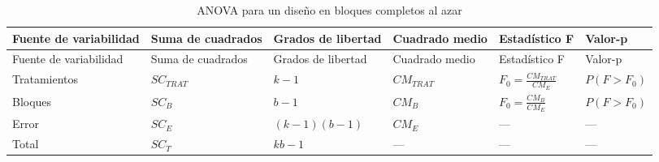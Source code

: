 \documentclass[
  spanish,
  letterpaper,
  DIV=11,
  numbers=noendperiod]{scrreprt}
\begin{document}
\begin{longtable}[]{@{}
  >{\raggedright\arraybackslash}p{}
  >{\raggedright\arraybackslash}p{}
  >{\raggedright\arraybackslash}p{}
  >{\raggedright\arraybackslash}p{}
  >{\raggedright\arraybackslash}p{}
  >{\raggedright\arraybackslash}p{}@{}}
\caption{ANOVA para un diseño en bloques completos al
azar}\label{tbl-anova}\tabularnewline
\toprule\noalign{}
\begin{minipage}[b]{\linewidth}\raggedright
Fuente de variabilidad
\end{minipage} & \begin{minipage}[b]{\linewidth}\raggedright
Suma de cuadrados
\end{minipage} & \begin{minipage}[b]{\linewidth}\raggedright
Grados de libertad
\end{minipage} & \begin{minipage}[b]{\linewidth}\raggedright
Cuadrado medio
\end{minipage} & \begin{minipage}[b]{\linewidth}\raggedright
Estadístico F
\end{minipage} & \begin{minipage}[b]{\linewidth}\raggedright
Valor-p
\end{minipage} \\
\midrule\noalign{}
\endfirsthead
\toprule\noalign{}
\begin{minipage}[b]{\linewidth}\raggedright
Fuente de variabilidad
\end{minipage} & \begin{minipage}[b]{\linewidth}\raggedright
Suma de cuadrados
\end{minipage} & \begin{minipage}[b]{\linewidth}\raggedright
Grados de libertad
\end{minipage} & \begin{minipage}[b]{\linewidth}\raggedright
Cuadrado medio
\end{minipage} & \begin{minipage}[b]{\linewidth}\raggedright
Estadístico F
\end{minipage} & \begin{minipage}[b]{\linewidth}\raggedright
Valor-p
\end{minipage} \\
\midrule\noalign{}
\endhead
\bottomrule\noalign{}
\endlastfoot
Tratamientos & \(SC_{TRAT}\) & \(k - 1\) & \(CM_{TRAT}\) &
\(F_0 = \frac{CM_{TRAT}}{CM_E}\) & \(P(F > F_0)\) \\
Bloques & \(SC_B\) & \(b - 1\) & \(CM_B\) &
\(F_0 = \frac{CM_{B}}{CM_E}\) & \(P(F > F_0)\) \\
Error & \(SC_E\) & \((k - 1)(b - 1)\) & \(CM_E\) & --- & --- \\
Total & \(SC_T\) & \(kb - 1\) & --- & --- & --- \\
\end{longtable}
\end{document}

